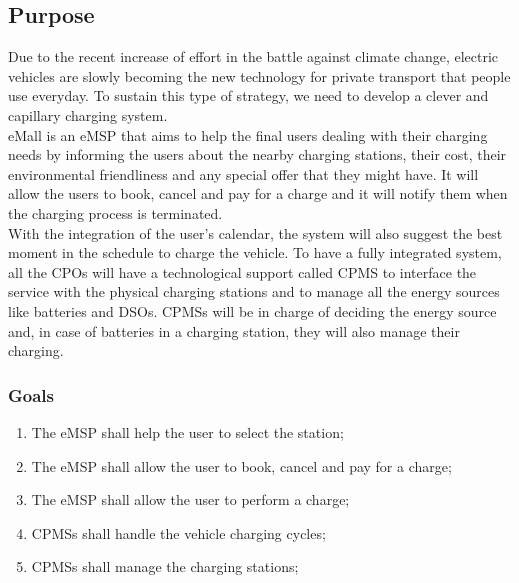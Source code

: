 


\subsection{Purpose}
Due to the recent increase of effort in the battle against climate change, electric vehicles are slowly becoming the new technology for private transport that   people use everyday.
To sustain this type of strategy, we need to develop a clever and capillary charging system.\\
\acf{eMall} is an \acf{eMSP} that aims to help the final users dealing with their charging needs by informing the users about the nearby charging stations, their cost, their environmental friendliness and any special offer that they might have.
It will allow the users to book, cancel and pay for a charge and it will notify them when the charging process is terminated.\\
With the integration of the user's calendar, the system will also suggest the best moment in the schedule to charge the vehicle.
To have a fully integrated system, all the \acfp{CPO} will have a technological support called \acf{CPMS} to interface the service with the physical charging stations and to manage all the energy sources like batteries and \acfp{DSO}.
\acp{CPMS} will be in charge of deciding the energy source and, in case of batteries in a charging station, they will also manage their charging.
\subsubsection{Goals}
%
\begin{enumerate}[label=\textbf{G\arabic*}]
    \item The \ac{eMSP} shall help the user to select the station;\label{goal:eMSP-helps-selecting}
    \item The \ac{eMSP} shall allow the user to book, cancel and pay for a charge;\label{goal:eMSP-booking-charge}
    \item The \ac{eMSP} shall allow the user to perform a charge;\label{goal:eMSP-allow-charge}
    \item \acp{CPMS} shall handle the vehicle charging cycles;\label{goal:CPMS-handles-charge}
    \item \acp{CPMS} shall manage the charging stations;\label{goal:CPMS-manage-station}
\end{enumerate}

